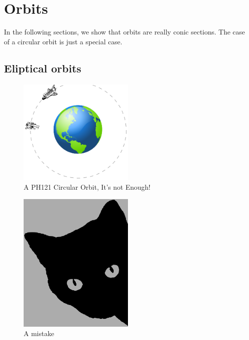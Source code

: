 \chapter{Orbits}
In the following sections, we show that orbits are really conic sections. The case of a circular orbit is just a special case.
\section{Eliptical orbits}


\begin{figure}[h]
	\begin{center}
	\includegraphics[width=0.5\textwidth]{orbit_figure}	
	\caption{A PH121 Circular Orbit, It's not Enough!}
\end{center}
\end{figure}

\begin{figure}[h]
	\begin{center}
		\includegraphics[width=0.5\textwidth]{cat}	
		\caption{A mistake}
	\end{center}
\end{figure}

